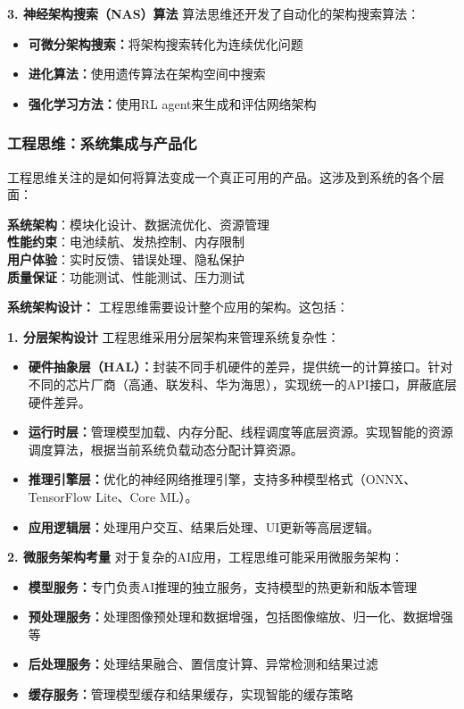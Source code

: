 \textbf{3. 神经架构搜索（NAS）算法}
算法思维还开发了自动化的架构搜索算法：
\begin{itemize}
\item \textbf{可微分架构搜索：}将架构搜索转化为连续优化问题
\item \textbf{进化算法：}使用遗传算法在架构空间中搜索
\item \textbf{强化学习方法：}使用RL agent来生成和评估网络架构
\end{itemize}

\subsubsection{工程思维：系统集成与产品化}

工程思维关注的是如何将算法变成一个真正可用的产品。这涉及到系统的各个层面：

\begin{tcolorbox}[colback=purple!5!white,colframe=purple!75!black,title=工程原则：系统设计的四大支柱]
\textbf{系统架构}：模块化设计、数据流优化、资源管理\\
\textbf{性能约束}：电池续航、发热控制、内存限制\\
\textbf{用户体验}：实时反馈、错误处理、隐私保护\\
\textbf{质量保证}：功能测试、性能测试、压力测试
\end{tcolorbox}

\textbf{系统架构设计：}
工程思维需要设计整个应用的架构。这包括：

\textbf{1. 分层架构设计}
工程思维采用分层架构来管理系统复杂性：
\begin{itemize}
\item \textbf{硬件抽象层（HAL）：}封装不同手机硬件的差异，提供统一的计算接口。针对不同的芯片厂商（高通、联发科、华为海思），实现统一的API接口，屏蔽底层硬件差异。
\item \textbf{运行时层：}管理模型加载、内存分配、线程调度等底层资源。实现智能的资源调度算法，根据当前系统负载动态分配计算资源。
\item \textbf{推理引擎层：}优化的神经网络推理引擎，支持多种模型格式（ONNX、TensorFlow Lite、Core ML）。
\item \textbf{应用逻辑层：}处理用户交互、结果后处理、UI更新等高层逻辑。
\end{itemize}

\textbf{2. 微服务架构考量}
对于复杂的AI应用，工程思维可能采用微服务架构：
\begin{itemize}
\item \textbf{模型服务：}专门负责AI推理的独立服务，支持模型的热更新和版本管理
\item \textbf{预处理服务：}处理图像预处理和数据增强，包括图像缩放、归一化、数据增强等
\item \textbf{后处理服务：}处理结果融合、置信度计算、异常检测和结果过滤
\item \textbf{缓存服务：}管理模型缓存和结果缓存，实现智能的缓存策略
\end{itemize}

